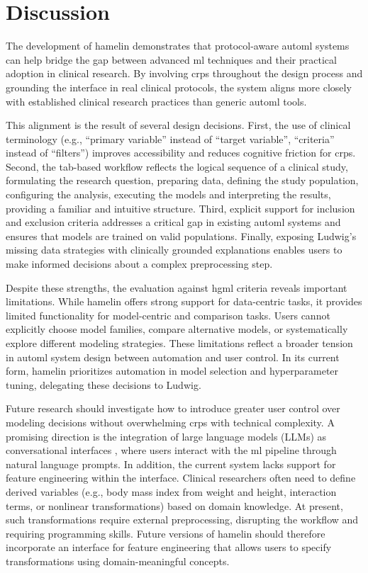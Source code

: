 \documentclass[conference,twocolumn]{IEEEtran}
\begin{document}
\section{Discussion}  
\label{sec:discussion}

The development of \gls{hamelin} demonstrates that protocol-aware \gls{automl} systems can help bridge the gap between advanced \gls{ml} techniques and their practical adoption in clinical research. By involving \glspl{crp} throughout the design process and grounding the interface in real clinical protocols, the system aligns more closely with established clinical research practices than generic \gls{automl} tools.
  
This alignment is the result of several design decisions. First, the use of clinical terminology (e.g., ``primary variable'' instead of ``target variable'', ``criteria'' instead of ``filters'') improves accessibility and reduces cognitive friction for \glspl{crp}. Second, the tab-based workflow reflects the logical sequence of a clinical study, formulating the research question, preparing data, defining the study population, configuring the analysis, executing the models and interpreting the results, providing a familiar and intuitive structure. Third, explicit support for inclusion and exclusion criteria addresses a critical gap in existing \gls{automl} systems and ensures that models are trained on valid populations. Finally, exposing Ludwig's missing data strategies with clinically grounded explanations enables users to make informed decisions about a complex preprocessing step.  
  
Despite these strengths, the evaluation against \gls{hgml} criteria reveals  
important limitations. While \gls{hamelin} offers strong support for data-centric  
tasks, it provides limited functionality for model-centric and comparison tasks.  
Users cannot explicitly choose model families, compare alternative models, or  
systematically explore different modeling strategies. These limitations reflect a  
broader tension in \gls{automl} system design between automation and user control.  
In its current form, \gls{hamelin} prioritizes automation in model selection and  
hyperparameter tuning, delegating these decisions to Ludwig.

Future research should investigate how to introduce greater user control over modeling decisions without overwhelming \glspl{crp} with technical complexity. A promising direction is the integration of large language models (LLMs) as conversational interfaces \cite{miguel2025integrating}, where users interact with the \gls{ml} pipeline through natural language prompts. In addition, the current system lacks support for feature engineering within the interface. Clinical researchers often need to define derived variables (e.g., body mass index from weight and height, interaction terms, or nonlinear transformations) based on domain knowledge. At present, such transformations require external preprocessing, disrupting the workflow and requiring programming skills. Future versions of \gls{hamelin} should therefore incorporate an interface for feature engineering that allows users to specify transformations using domain-meaningful concepts.
\end{document}
